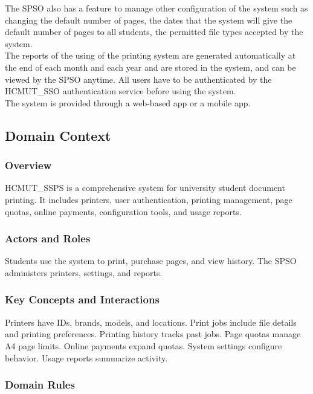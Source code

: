 The SPSO also has a feature to manage other configuration of the system such as changing the
default number of pages, the dates that the system will give the default number of pages to all
students, the permitted file types accepted by the system.\\

The reports of the using of the printing system are generated automatically at the end of each
month and each year and are stored in the system, and can be viewed by the SPSO anytime.
All users have to be authenticated by the HCMUT\_SSO authentication service before using the
system.\\

The system is provided through a web-based app or a mobile app.

\subsection{Domain Context}

\subsubsection{Overview}

HCMUT\_SSPS is a comprehensive system for university student document printing. It includes printers, user authentication, printing management, page quotas, online payments, configuration tools, and usage reports.

\subsubsection{Actors and Roles}

Students use the system to print, purchase pages, and view history. The SPSO administers printers, settings, and reports.

\subsubsection{Key Concepts and Interactions}

Printers have IDs, brands, models, and locations. Print jobs include file details and printing preferences. Printing history tracks past jobs. Page quotas manage A4 page limits. Online payments expand quotas. System settings configure behavior. Usage reports summarize activity.

\subsubsection{Domain Rules}

